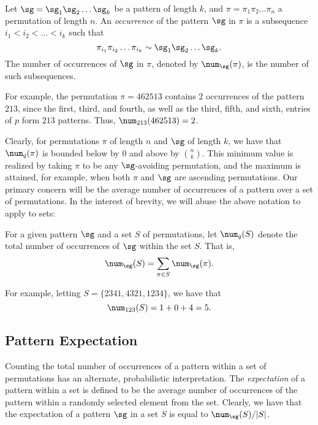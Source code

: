 \documentclass[12pt,twoside]{memoir}
\begin{document}
    \begin{definition} \label{def:occurrence} 
      Let $\sg = \sg_1 \sg_2 \dots \sg_k$ be a pattern of length $k$, and $\pi =
      \pi_1 \pi_2 \dots \pi_n$ a permutation of length $n$. An \emph{occurrence} of the
      pattern $\sg$ in $\pi$ is a subsequence $i_1 < i_2 < \dots < i_k$ such
      that 
      $$ \pi_{i_1} \pi_{i_2} \dots \pi_{i_k} \sim \sg_1 \sg_2 \dots \sg_k. $$ 
      The number of occurrences of $\sg$ in $\pi$, denoted by $\num_\sg(\pi)$, is
      the number of such subsequences.  
    \end{definition}
      
    For example, the permutation $\pi = 462513$ contains $2$ occurrences of the
    pattern $213$, since the first, third, and fourth, as well as the third,
    fifth, and sixth, entries of $p$ form $213$ patterns. Thus,
    $\num_{213}(462513) = 2$.  

    

    Clearly, for permutations $\pi$ of length $n$ and $\sg$ of length $k$, we have
    that $\num_q(\pi)$ is bounded below by $0$ and above by $\binom{n}{k}$. This
    minimum value is realized by taking $\pi$ to be any $\sg$-avoiding
    permutation, and the maximum is attained, for example, when both $\pi$ and
    $\sg$ are ascending permutations.  Our primary concern will be the average
    number of occurrences of a pattern over a set of permutations. In the interest
    of brevity, we will abuse the above notation to apply to sets:
    
    \begin{definition} \label{def:set-occurrence} For a given pattern $\sg$ and a
    set $S$ of permutations, let $\num_q(S)$ denote the total number of
    occurrences of $\sg$ within the set $S$. That is, $$ \num_\sg(S) = \sum_{\pi
    \in S} \num_\sg(\pi).$$ \end{definition}
    
    For example, letting $S = \{2341, 4321, 1234\}$, we have that 
    $$ \num_{123}(S) = 1 + 0 + 4 = 5.$$ 


    \subsection{Pattern Expectation}
        
      Counting the total number of occurrences of a pattern within a set of
      permutations has an alternate, probabilistic interpretation. The
      \emph{expectation}  of a pattern within a set is defined
      to be the average number of occurrences of the pattern within a randomly
      selected element from the set. Clearly, we have that the expectation of a
      pattern $\sg$ in a set $S$ is equal to $\num_\sg(S) / |S|$. 
      
\end{document}
